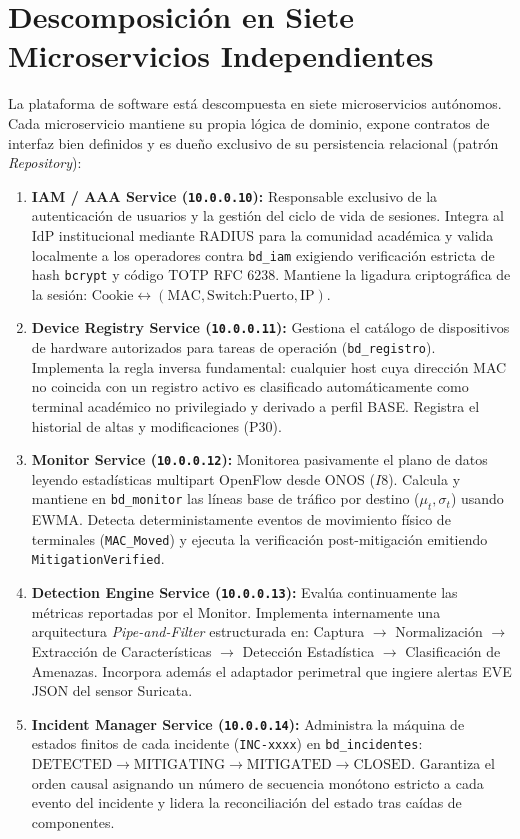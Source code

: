 \documentclass[11pt,a4paper]{report}
\begin{document}
\section{Descomposición en Siete Microservicios Independientes}
La plataforma de software está descompuesta en siete microservicios autónomos. Cada microservicio mantiene su propia lógica de dominio, expone contratos de interfaz bien definidos y es dueño exclusivo de su persistencia relacional (patrón \emph{Repository}):

\begin{enumerate}[leftmargin=*]
    \item \textbf{IAM / AAA Service (\texttt{10.0.0.10}):} Responsable exclusivo de la autenticación de usuarios y la gestión del ciclo de vida de sesiones. Integra al IdP institucional mediante RADIUS para la comunidad académica y valida localmente a los operadores contra \texttt{bd\_iam} exigiendo verificación estricta de hash \texttt{bcrypt} y código TOTP RFC 6238. Mantiene la ligadura criptográfica de la sesión: $\text{Cookie} \leftrightarrow (\text{MAC}, \text{Switch:Puerto}, \text{IP})$.
    \item \textbf{Device Registry Service (\texttt{10.0.0.11}):} Gestiona el catálogo de dispositivos de hardware autorizados para tareas de operación (\texttt{bd\_registro}). Implementa la regla inversa fundamental: cualquier host cuya dirección MAC no coincida con un registro activo es clasificado automáticamente como terminal académico no privilegiado y derivado a perfil BASE. Registra el historial de altas y modificaciones (P30).
    \item \textbf{Monitor Service (\texttt{10.0.0.12}):} Monitorea pasivamente el plano de datos leyendo estadísticas multipart OpenFlow desde ONOS ($I8$). Calcula y mantiene en \texttt{bd\_monitor} las líneas base de tráfico por destino ($\mu_t, \sigma_t$) usando EWMA. Detecta deterministamente eventos de movimiento físico de terminales (\texttt{MAC\_Moved}) y ejecuta la verificación post-mitigación emitiendo \texttt{MitigationVerified}.
    \item \textbf{Detection Engine Service (\texttt{10.0.0.13}):} Evalúa continuamente las métricas reportadas por el Monitor. Implementa internamente una arquitectura \emph{Pipe-and-Filter} estructurada en: Captura $\rightarrow$ Normalización $\rightarrow$ Extracción de Características $\rightarrow$ Detección Estadística $\rightarrow$ Clasificación de Amenazas. Incorpora además el adaptador perimetral que ingiere alertas EVE JSON del sensor Suricata.
    \item \textbf{Incident Manager Service (\texttt{10.0.0.14}):} Administra la máquina de estados finitos de cada incidente (\texttt{INC-xxxx}) en \texttt{bd\_incidentes}: $\text{DETECTED} \rightarrow \text{MITIGATING} \rightarrow \text{MITIGATED} \rightarrow \text{CLOSED}$. Garantiza el orden causal asignando un número de secuencia monótono estricto a cada evento del incidente y lidera la reconciliación del estado tras caídas de componentes.

\end{enumerate}
\end{document}
